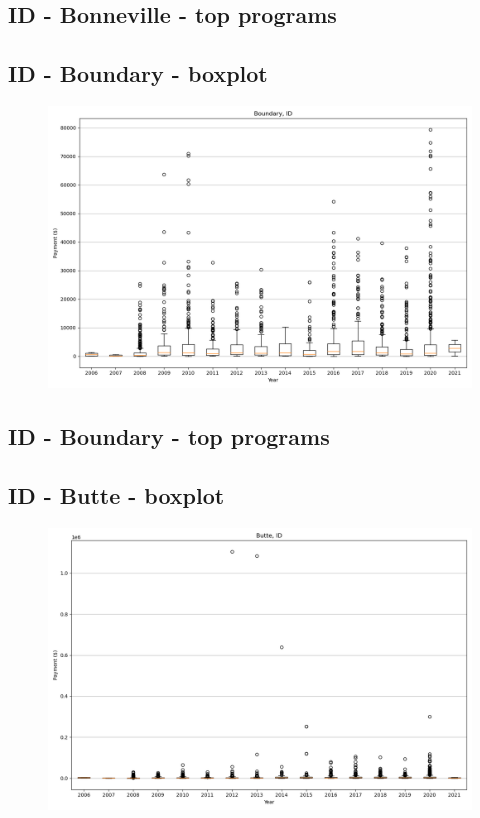 \subsection*{ID - Bonneville - top programs}

\newpage
\subsection*{ID - Boundary - boxplot}
\begin{figure}[h]
\centering
\includegraphics[width=7in]{../output/boxplots/counties/Boundary-ID_boxplot.png}
\end{figure}


\subsection*{ID - Boundary - top programs}

\newpage
\subsection*{ID - Butte - boxplot}
\begin{figure}[h]
\centering
\includegraphics[width=7in]{../output/boxplots/counties/Butte-ID_boxplot.png}
\end{figure}


